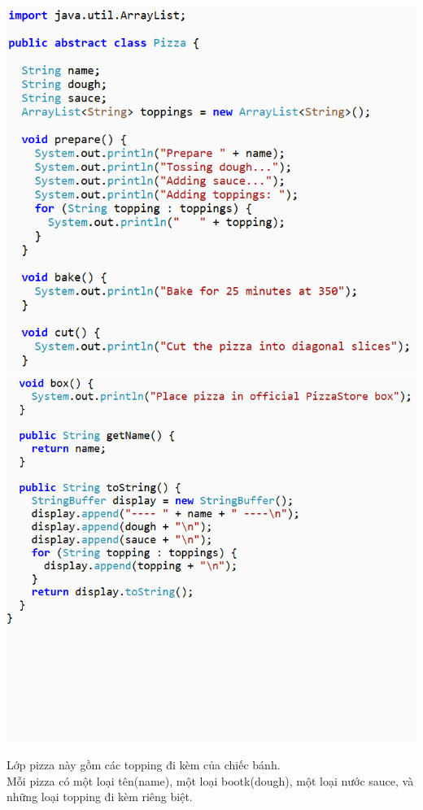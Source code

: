 \newpage
\begin{multicols}{2}
	\includegraphics[width=1\columnwidth]{GALLEYS/images/chapter5/images4}
	\includegraphics[width=1\columnwidth]{GALLEYS/images/chapter5/images5}
\end{multicols}

Lớp pizza này gồm các topping đi kèm của chiếc bánh.\\
Mỗi pizza có một loại tên(name), một loại bootk(dough), một loại nước sauce, và những loại topping đi kèm riêng biệt.\\

